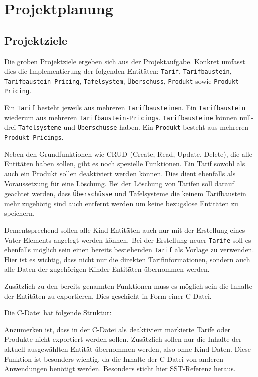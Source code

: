 \chapter{Projektplanung}\label{ch:data}
\section{Projektziele}
Die groben Projektziele ergeben sich aus der Projektaufgabe. Konkret umfasst dies die Implementierung der folgenden Entitäten:
\texttt{Tarif}, \texttt{Tarifbaustein}, \texttt{Tarif\-baustein-Pricing}, \texttt{Tafelsystem}, \texttt{Überschuss}, \texttt{Produkt} sowie \texttt{Produkt-Pricing}.

Ein \texttt{Tarif} besteht jeweils aus mehreren \texttt{Tarifbausteinen}. Ein \texttt{Tarifbaustein} wiederum aus mehreren \texttt{Tarifbaustein-Pricings}. \texttt{Tarifbausteine} können null-drei \texttt{Tafelsysteme} und \texttt{Überschüsse} haben.
Ein \texttt{Produkt} besteht aus mehreren \texttt{Produkt-Pricings}. 

Neben den Grundfunktionen wie CRUD (Create, Read, Update, Delete), die alle Entitäten haben sollen, gibt es noch spezielle Funktionen.
Ein Tarif sowohl als auch ein Produkt sollen deaktiviert werden können. Dies dient ebenfalls als Voraussetzung für eine Löschung. Bei der Löschung von Tarifen soll darauf geachtet werden, dass \texttt{Überschüsse} und
Tafelsysteme die keinem Tarifbaustein mehr zugehörig sind auch entfernt werden um keine bezugslose Entitäten zu speichern. 

Dementsprechend sollen alle Kind-Entitäten auch nur mit der Erstellung eines Vater-Elements angelegt werden können.
Bei der Erstellung neuer \texttt{Tarife} soll es ebenfalls möglich sein einen bereits bestehenden \texttt{Tarif} als Vorlage zu verwenden. Hier ist es wichtig, dass nicht nur die direkten Tarifinformationen, 
sondern auch alle Daten der zugehörigen Kinder-Entitäten übernommen werden.

Zusätzlich zu den bereits genannten Funktionen muss es möglich sein 
die Inhalte der Entitäten zu exportieren. Dies geschieht in Form einer C-Datei. 

Die C-Datei hat folgende Struktur: 

Anzumerken ist, dass in der C-Datei als deaktiviert markierte Tarife oder Produkte nicht exportiert werden sollen. Zusätzlich sollen nur die Inhalte der aktuell ausgewählten Entität übernommen werden, also ohne Kind Daten.
Diese Funktion ist besonders wichtig, da die Inhalte der C-Datei von anderen Anwendungen benötigt werden. Besonders sticht hier SST-Referenz heraus.

